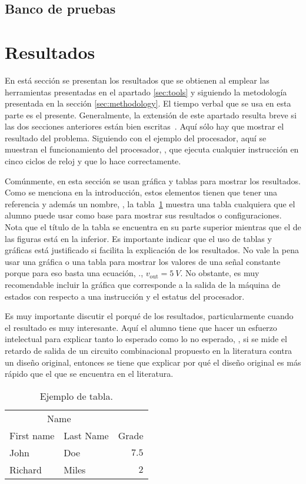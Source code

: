 \documentclass[12pt]{article}
\begin{document}
\subsection{Banco de pruebas}

\section{Resultados}\label{sec:results}

En está sección se presentan los resultados que se obtienen al emplear las 
herramientas presentadas en el apartado \ref{sec:tools} y siguiendo la 
metodología presentada en la sección \ref{sec:methodology}. El tiempo verbal 
que se usa en esta parte es el presente. Generalmente, la extensión de este 
apartado resulta breve si las dos secciones anteriores están bien 
escritas~\cite{DaRo05}. Aquí sólo hay que mostrar el resultado del problema. 
Siguiendo con el ejemplo del procesador, aquí se muestran el funcionamiento 
del procesador, \eg, que ejecuta cualquier instrucción en cinco ciclos de 
reloj y que lo hace correctamente.

Comúnmente, en esta sección se usan gráfica y tablas para mostrar los 
resultados. Como se menciona en la introducción, estos elementos tienen que 
tener una referencia y además un nombre, \eg, la tabla~\ref{tab:example} 
muestra una tabla cualquiera que el alumno puede usar como base para mostrar 
sus resultados o configuraciones. Nota que el título de la tabla se encuentra 
en su parte superior mientras que el de las figuras está en la inferior. Es 
importante indicar que el uso de tablas y gráficas está justificado si facilita 
la explicación de los resultados. No vale la pena usar una gráfica o una tabla 
para mostrar los valores de una señal constante porque para eso basta una 
ecuación, \eg., $v_\mathrm{out} = \SI{5}{V}$. No obstante, es muy recomendable 
incluir la gráfica que corresponde a la salida de la máquina de estados con 
respecto a una instrucción y el estatus del procesador.

Es muy importante discutir el porqué de los resultados, particularmente cuando 
el resultado es muy interesante. Aquí el alumno tiene que hacer un esfuerzo 
intelectual para explicar tanto lo esperado como lo no esperado, \eg, si se 
mide el retardo de salida de un circuito combinacional propuesto en la 
literatura contra un diseño original, entonces se tiene que explicar por qué el 
diseño original es más rápido que el que se encuentra en el literatura.

\begin{table}
   \centering
   \caption{Ejemplo de tabla.}
   \begin{tabular}{llr}
      \toprule
      \multicolumn{2}{c}{Name} \\
      \cmidrule(r){1-2} First name & Last Name & Grade \\ 
      \midrule John & Doe & $7.5$ \\
      Richard & Miles & $2$ \\
      \bottomrule
   \end{tabular}
   \label{tab:example}
\end{table}
\end{document}
